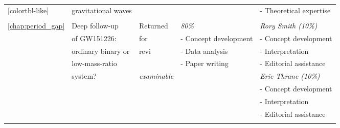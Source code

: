 \begin{table*}
\begin{NiceTabular}{V{50mm}V{2.9cm}V{1.3cm}V{3.4cm}V{3.5cm}}[colortbl-like]
                & gravitational waves &                       &                        & - Theoretical expertise    \\ 
                &                     &                       &                        &                            \\
\ref{chap:period_gap}   & Deep follow-up      & Returned              & \textit{80\%}          & \textit{Rory Smith (10\%)}          \\
                & of GW151226:        & for                   & - Concept development  & - Concept development      \\
                & ordinary binary or  & revi              & - Data analysis        & - Interpretation           \\
                & low-mass-ratio      &                  & - Paper writing        & - Editorial assistance     \\
                & system?             & \textit{examinable}   &                        & \textit{Eric Thrane (10\%)}         \\
                &                     &                       &                        & - Concept development      \\
                &                     &                       &                        & - Interpretation           \\
                &                     &                       &                        & - Editorial assistance     \\
                &                     &                       &                        &                            \\
\end{NiceTabular}  
\end{table*}